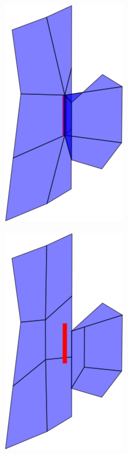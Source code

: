 \begin{figure}
\begin{center}
\begin{subfigure}[b]{.45\textwidth}
\includegraphics[height = .17\textheight, width = .5\textwidth,keepaspectratio]{Pictures/SurfaceReconstruction/3DManifoldII}
\end{subfigure}
\begin{subfigure}[b]{.45\textwidth}
\centering
\includegraphics[height = .17\textheight, width = .5\textwidth,keepaspectratio]{Pictures/SurfaceReconstruction/3DManifoldIIRes}

\end{subfigure}
\end{center}
\end{figure}
